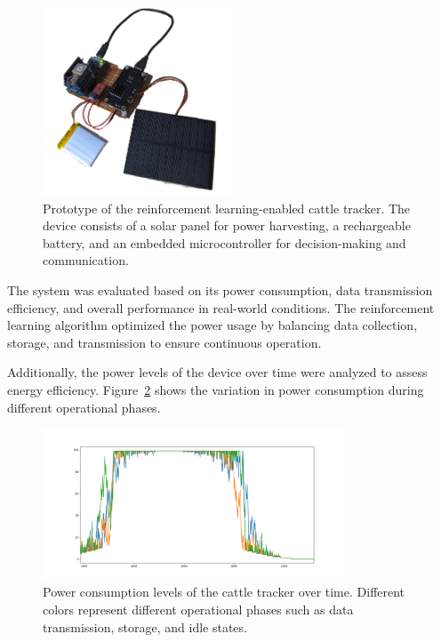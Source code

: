 \documentclass[10pt]{cai}
\begin{document}
\begin{figure}[htbp]
  \centering
  \includegraphics[width=0.5\textwidth]{./figs/prototype_clean.png}
  \caption{Prototype of the reinforcement learning-enabled cattle tracker. The device consists of a solar panel for power harvesting, a rechargeable battery, and an embedded microcontroller for decision-making and communication.}
  \label{fig:prototype}
\end{figure}

The system was evaluated based on its power consumption, data transmission efficiency, and overall performance in real-world conditions. The reinforcement learning algorithm optimized the power usage by balancing data collection, storage, and transmission to ensure continuous operation.

Additionally, the power levels of the device over time were analyzed to assess energy efficiency. Figure~\ref{fig:power_levels} shows the variation in power consumption during different operational phases.

\begin{figure}[htbp]
    \centering
    \includegraphics[width=0.8\textwidth]{./figs/power_levels.png}
    \caption{Power consumption levels of the cattle tracker over time. Different colors represent different operational phases such as data transmission, storage, and idle states.}
    \label{fig:power_levels}
\end{figure}
\end{document}
